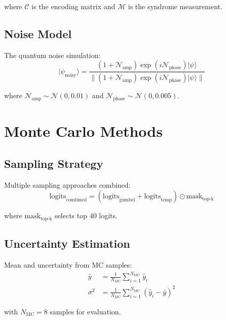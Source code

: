 \documentclass{article}
\begin{document}
where $\mathcal{C}$ is the encoding matrix and $\mathcal{M}$ is the syndrome measurement.

\subsection{Noise Model}
The quantum noise simulation:
\begin{equation}
|\psi_{\text{noisy}}\rangle = \frac{(1 + \mathcal{N}_{\text{amp}})\exp(i\mathcal{N}_{\text{phase}})|\psi\rangle}{\|(1 + \mathcal{N}_{\text{amp}})\exp(i\mathcal{N}_{\text{phase}})|\psi\rangle\|}
\end{equation}

where $\mathcal{N}_{\text{amp}} \sim \mathcal{N}(0,0.01)$ and $\mathcal{N}_{\text{phase}} \sim \mathcal{N}(0,0.005)$.

\section{Monte Carlo Methods}

\subsection{Sampling Strategy}
Multiple sampling approaches combined:
\begin{equation}
\text{logits}_{\text{combined}} = (\text{logits}_{\text{gumbel}} + \text{logits}_{\text{temp}}) \odot \text{mask}_{\text{top-k}}
\end{equation}

where $\text{mask}_{\text{top-k}}$ selects top 40 logits.

\subsection{Uncertainty Estimation}
Mean and uncertainty from MC samples:
\begin{align*}
\bar{y} &= \frac{1}{N_{\text{MC}}}\sum_{i=1}^{N_{\text{MC}}} \hat{y}_i \\
\sigma^2 &= \frac{1}{N_{\text{MC}}}\sum_{i=1}^{N_{\text{MC}}}(\hat{y}_i - \bar{y})^2
\end{align*}

with $N_{\text{MC}}=8$ samples for evaluation.
\end{document}
